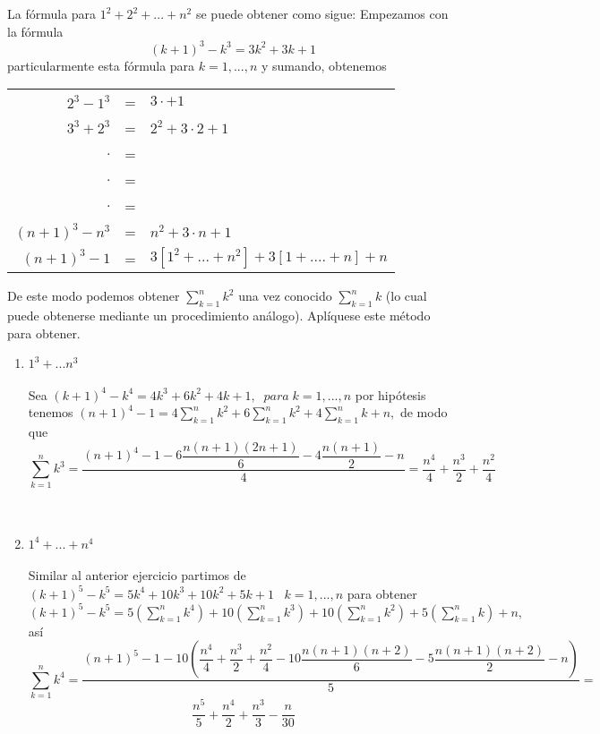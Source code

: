 \begin{ej}
La fórmula para $1^2 + 2^2 + ... + n^2$ se puede obtener como sigue: Empezamos con la fórmula $$(k+1)^3 - k^3 = 3k^2 + 3k +1$$
particularmente esta fórmula para $k=1,...,n$ \; y sumando, obtenemos \begin{center}
\begin{tabular}{r c l}
$2^3 - 1^3$&=&$3\cdot +1$\\
$3^3 + 2^3$&=&$2^2 + 3\cdot 2 +1 $\\
$.$&=&\\
$.$&=&\\
$.$&=&\\
$(n+1)^3 - n^3$&=&$n^2 + 3 \cdot n + 1$\\
\hline
$(n+1)^3 - 1$&=&$3 \left[ 1^2 + ... + n^2 \right] + 3 \left[ 1 + .... + n \right] + n$\\
\end{tabular}
\end{center}
De este modo podemos obtener $\displaystyle\sum_{k=1}^n k^2$ una vez conocido $\displaystyle\sum_{k=1}^n k $ (lo cual puede obtenerse mediante un procedimiento análogo). Aplíquese este método para obtener.
\begin{enumerate}[\bfseries i)]
\item $1^3 + ... n^3$\\\\
Sea $(k+1)^4 - k^4 = 4k^3 + 6k^2 +4k + 1, \; \; para \; k=1,...,n $ por hipótesis tenemos $(n+1)^4 - 1 = 4 \displaystyle\sum_{k=1}^n k^2 + 6 \sum_{k=1}^n k^2 + 4 \sum_{k=1}^n k + n,$ de modo que $$\displaystyle\sum_{k=1}^n k^3 = \dfrac{ (n+1)^4 -1 - 6 \dfrac{n(n+1)(2n+1)}{6} - 4 \dfrac{n(n+1)}{2} - n}{4} = \dfrac{n^4}{4} + \dfrac{n^3}{2} + \dfrac{n^2}{4}$$\\\\

\item $1^4 + ... + n^4$\\\\
Similar al anterior ejercicio partimos de $(k+1)^5 - k^5 = 5k^4 + 10k^3 + 10k^2 + 5k + 1 \; \; \; k=1,...,n$ para obtener $(k+1)^5 - k^5 = 5 \left( \displaystyle\sum_{k=1}^n k^4 \right) + 10 \left( \sum_{k=1}^n k^3 \right) + 10 \left( \sum_{k=1}^n k^2 \right) + 5 \left( \sum_{k=1}^n k \right) + n,$ así $$\displaystyle\sum_{k=1}^n k^4 = \dfrac{(n+1)^5 - 1 - 10\left( \dfrac{n^4}{4} + \dfrac{n^3}{2} + \dfrac{n^2}{4} - 10 \dfrac{n(n+1)(n+2)}{6} - 5 \dfrac{n(n+1)(n+2)}{2} -n \right)}{5} = $$ $$\dfrac{n^5}{5} + \dfrac{n^4}{2} + \dfrac{n^3}{3} - \dfrac{n}{30}$$\\\\


\end{enumerate}
\end{ej}
